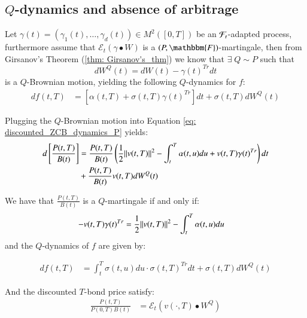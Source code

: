 \newpage 
\subsection{$Q$-dynamics and absence of arbitrage}
Let $\gamma(t) = (\gamma_{1}(t), \dots, \gamma_{d}(t)) \in M^{2}([0,T])$ be an $\mathcal{F}_{t}$-adapted process, furthermore assume that $\mathcal{E}_{t}(\gamma \bullet W)$ is a $(P,\mathbbm{F})$-martingale, then from Girsanov's Theorem (\ref{thm: Girsanov's_thm}) we know that $\exists\; Q \sim P$
such that
\[
dW^{Q}(t) = dW(t) - \gamma(t)^{Tr}dt
\]
is a $Q$-Brownian motion, yielding the following $Q$-dynamics for $f$:
\begin{align}
\label{eq: dynamics_d_under_Q}
df(t,T) &= [\alpha(t,T) + \sigma(t,T)\gamma(t)^{Tr}]dt 
        + \sigma(t,T)dW^{Q}(t)    
\end{align}

Plugging the $Q$-Brownian motion into Equation \ref{eq: discounted_ZCB_dynamics_P} yields: 
\begin{align*}
d\left[
\frac{P(t,T)}{B(t)}
\right]
&= 
\frac{P(t,T)}{B(t)}\left(
\frac{1}{2}\norm{v(t,T)}^{2} - \int_{t}^{T}\alpha(t,u)du
+ v(t,T)\gamma(t)^{Tr}
\right)dt\\ 
&+ 
\frac{P(t,T)}{B(t)}v(t,T)dW^{Q}(t)
\end{align*} 


\begin{theorem}
We have that $\frac{P(t,T)}{B(t)}$ is a $Q$-martingale if and only if: 
\begin{align}
\label{thm: arbitrage_condition_Q}
-v(t,T)\gamma(t)^{Tr}
&= 
\frac{1}{2}\norm{v(t,T)}^{2} - \int_{t}^{T}\alpha(t,u)du
\end{align}
and the $Q$-dynamics of $f$ are given by: 

\begin{align*}
df(t,T) &= \int_{t}^{T}\sigma(t,u)du
\cdot \sigma(t,T)^{Tr}dt
         + \sigma(t,T)dW^{Q}(t)    
\end{align*}

And the discounted $T$-bond price satisfy:
\begin{align*}
\frac{P(t,T)}{P(0,T)B(t)} &= \mathcal{E}_{t}(v(\cdot, T)\bullet W^{Q})
\end{align*}
\end{theorem} 

